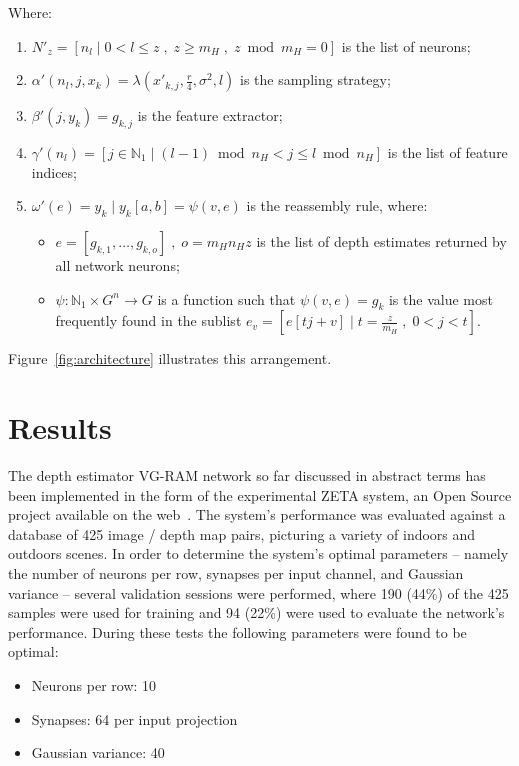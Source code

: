 \documentclass[twocolumn, 9pt]{jsproceedings}
\begin{document}
Where:

\begin{enumerate}
\item \(N'_z = [n_l \; | \; 0 < l \leq z \; , \; z \geq m_H \; , \; z \bmod m_H = 0]\) is the list of neurons;
\item \(\alpha'(n_l, j, x_k) = \lambda(x'_{k,j}, \frac{r}{4}, \sigma^2, l)\) is the sampling strategy;
\item \(\beta'(j, y_k) = g_{k, j}\) is the feature extractor;
\item \(\gamma'(n_l) = [j \in \mathbb{N}_1 \; | \; (l - 1) \bmod n_H < j \leq l \bmod n_H]\) is the list of feature indices;
\item \(\omega'(e) = y_k \; | \; y_k[a,b] = \psi(v, e)\) is the reassembly rule, where:
\begin{itemize}
\item \(e = [g_{k,1}, \dotsc, g_{k,o}] \; , \; o = m_H n_H z\) is the list of depth estimates returned by all network neurons;
\item \(\psi : \mathbb{N}_1 \times G^n \to G\) is a function such that \(\psi(v, e) = g_k\) is the value most frequently found in the sublist \(e_v = [e[t j + v] \; | \; t = \frac{z}{m_H} \; , \; 0 < j < t]\).
\end{itemize}
\end{enumerate}

Figure~\ref{fig:architecture} illustrates this arrangement.

\section{Results}

The depth estimator VG-RAM network so far discussed in abstract terms has been implemented in the form of the experimental ZETA system, an Open Source project available on the web~\cite{zeta}. The system's performance was evaluated against a database of 425 image / depth map pairs, picturing a variety of indoors and outdoors scenes. In order to determine the system's optimal parameters -- namely the number of neurons per row, synapses per input channel, and Gaussian variance -- several validation sessions were performed, where 190 (44\%) of the 425 samples were used for training and 94 (22\%) were used to evaluate the network's performance. During these tests the following parameters were found to be optimal:

\begin{itemize}
\item Neurons per row: 10
\item Synapses: 64 per input projection
\item Gaussian variance: 40
\end{itemize}
\end{document}
